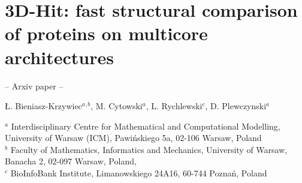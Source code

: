 \documentclass[envcountsame,envcountchap]{svmono}
\begin{document}
\chapter{3D-Hit: fast structural comparison of proteins on multicore architectures}
\label{DPlewczynski} %


\begin{flushright}
-- Arxiv paper -- \\
\end{flushright}

\hspace{20 mm}

\begin{center}
\L{}. Bieniasz-Krzywiec$^a$$^,$$^b$, M. Cytowski$^a$, L. Rychlewski$^c$, D. Plewczynski$^a$ \\
\end{center}
\hspace{20 mm}

\begin{flushleft} 
$^a$ Interdisciplinary Centre for Mathematical and Computational Modelling, \\
University of Warsaw (ICM), 
Pawi\'nskiego 5a, 02-106 Warsaw, Poland \\
$^b$ Faculty of Mathematics, Informatics and Mechanics, University of Warsaw,\\ Banacha 2, 02-097 Warsaw, Poland, \\
$^c$ BioInfoBank Institute, Limanowskiego 24A16, 60-744 Pozna\'n, Poland \\
\end{flushleft}



\end{document}
